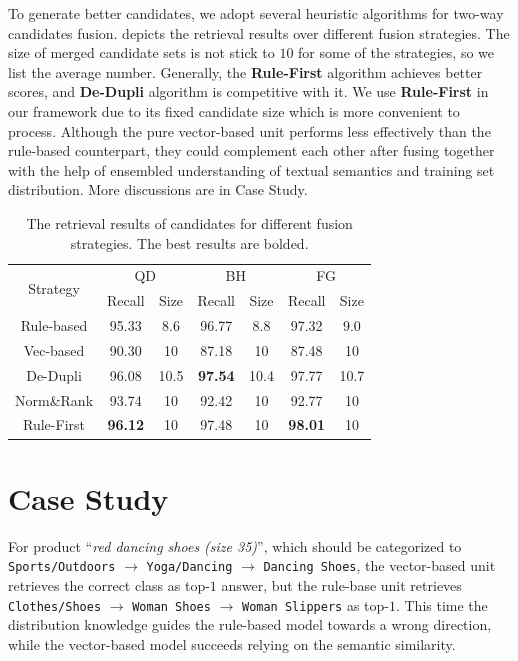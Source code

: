 To generate better candidates, we adopt several heuristic algorithms for two-way candidates fusion.
 depicts the retrieval results over different fusion strategies. The size of merged candidate sets is not stick to $10$ for some of the strategies, so we list the average number.
Generally, the \textbf{Rule-First} algorithm achieves better scores, and \textbf{De-Dupli} algorithm is competitive with it. We use \textbf{Rule-First} in our framework due to its fixed candidate size which is more convenient to process.
Although the pure vector-based unit performs less effectively than the rule-based counterpart, they could complement each other after fusing together with the help of ensembled understanding of textual semantics and training set distribution.
More discussions are in Case Study.

\begin{table}[th]
  \caption{The retrieval results of candidates for different fusion strategies. The best results are bolded.}
  \label{tb:fusion}
  \centering
  \begin{tabular}{c|cc|cc|cc}
    \toprule
    \multirow{2}{*}{Strategy}  & \multicolumn{2}{c|}{QD} & \multicolumn{2}{c|}{BH} & \multicolumn{2}{c}{FG} \\
    \cline{2-7} 
      & Recall & Size & Recall & Size & Recall & Size \\
    \midrule
    Rule-based & 95.33 & 8.6 & 96.77 & 8.8 & 97.32 & 9.0 \\
    Vec-based & 90.30 & 10 & 87.18 & 10 & 87.48 & 10 \\
    \midrule
    De-Dupli & 96.08 & 10.5 & \textbf{97.54} & 10.4 & 97.77 & 10.7 \\
    Norm\&Rank & 93.74 & 10 & 92.42 & 10 & 92.77 & 10 \\
    Rule-First & \textbf{96.12} & 10 & 97.48 & 10 & \textbf{98.01} & 10 \\
    \bottomrule
  \end{tabular}
\end{table}

\section{Case Study}
For product ``\textit{red dancing shoes (size 35)}'', which should be categorized to \verb|Sports/Outdoors| $\rightarrow$ \verb|Yoga/Dancing| $\rightarrow$ \verb|Dancing Shoes|, the vector-based unit retrieves the correct class as top-$1$ answer, but the rule-base unit retrieves \verb|Clothes/Shoes| $\rightarrow$ \verb|Woman Shoes| $\rightarrow$ \verb|Woman Slippers| as top-$1$. This time the distribution knowledge guides the rule-based model towards a wrong direction, while the vector-based model succeeds relying on the semantic similarity.

